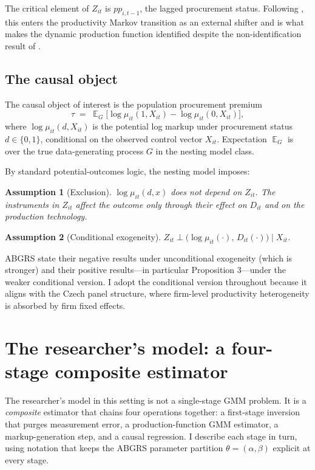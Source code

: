 \documentclass[11pt]{article}
\newtheorem{assumption}{Assumption}
\DeclareMathOperator{\E}{\mathbb{E}}
\begin{document}
The critical element of $Z_{it}$ is $pp_{i,t-1}$, the lagged procurement status. Following \citet{DeLoecker2013}, this enters the productivity Markov transition as an external shifter and is what makes the dynamic production function identified despite the non-identification result of \citet{GNR2020}.

\subsection{The causal object}

The causal object of interest is the population procurement premium
\begin{equation}\label{eq:tau}
\tau \;=\; \E_G\bigl[\log\mu_{it}(1,X_{it}) - \log\mu_{it}(0,X_{it})\bigr],
\end{equation}
where $\log\mu_{it}(d,X_{it})$ is the potential log markup under procurement status $d \in \{0,1\}$, conditional on the observed control vector $X_{it}$. Expectation $\E_G$ is over the true data-generating process $G$ in the nesting model class.

By standard potential-outcomes logic, the nesting model imposes:
\begin{assumption}[Exclusion]\label{ass:excl}
$\log\mu_{it}(d,x)$ does not depend on $Z_{it}$. The instruments in $Z_{it}$ affect the outcome only through their effect on $D_{it}$ and on the production technology.
\end{assumption}

\begin{assumption}[Conditional exogeneity]\label{ass:cond_exog}
$Z_{it} \perp \bigl(\log\mu_{it}(\cdot),\, D_{it}(\cdot)\bigr) \mid X_{it}$.
\end{assumption}

ABGRS \citep[p.~1810]{ABGRS2025} state their negative results under unconditional exogeneity (which is stronger) and their positive results---in particular Proposition 3---under the weaker conditional version. I adopt the conditional version throughout because it aligns with the Czech panel structure, where firm-level productivity heterogeneity is absorbed by firm fixed effects.

\section{The researcher's model: a four-stage composite estimator}\label{sec:researcher}

The researcher's model in this setting is not a single-stage GMM problem. It is a \emph{composite} estimator that chains four operations together: a first-stage inversion that purges measurement error, a production-function GMM estimator, a markup-generation step, and a causal regression. I describe each stage in turn, using notation that keeps the ABGRS parameter partition $\theta = (\alpha,\beta)$ explicit at every stage.
\end{document}
